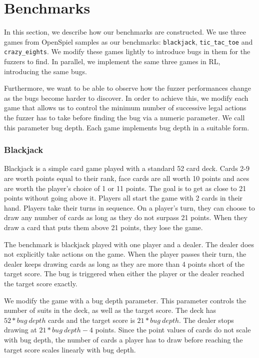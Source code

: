 \section{Benchmarks}
In this section, we describe how our benchmarks are constructed.
We use three games from OpenSpiel samples as our benchmarks: \texttt{blackjack}, \texttt{tic\_tac\_toe} and \texttt{crazy\_eights}.
We modify these games lightly to introduce bugs in them for the fuzzers to find.
In parallel, we implement the same three games in RL, introducing the same bugs.

Furthermore, we want to be able to observe how the fuzzer performances change as the bugs become harder to discover.
In order to achieve this, we modify each game that allows us to control the minimum number of successive legal actions the fuzzer has to take before finding the bug
via a numeric parameter.
We call this parameter bug depth. Each game implements bug depth in a suitable form.

\subsubsection{Blackjack}
Blackjack is a simple card game played with a standard 52 card deck.
Cards 2-9 are worth points equal to their rank, face cards are all worth 10 points and aces are worth the player's choice of 1 or 11 points.
The goal is to get as close to 21 points without going above it.
Players all start the game with 2 cards in their hand.
Players take their turns in sequence. On a player's turn, they can choose to draw any number of cards as long as they do not surpass 21 points.
When they draw a card that puts them above 21 points, they lose the game.

The benchmark is blackjack played with one player and a dealer. The dealer does not explicitly take actions on the game.
When the player passes their turn, the dealer keeps drawing cards as long as they are more than 4 points short of the target score.
The bug is triggered when either the player or the dealer reached the target score exactly.

We modify the game with a bug depth parameter. This parameter controls the number of suits in the deck, as well as the target score.
The deck has $52 * bug\ depth$ cards and the target score is $21 * bug\ depth$. The dealer stops drawing at $21 * bug\ depth - 4$ points.
Since the point values of cards do not scale with bug depth, the number of cards a player has to draw before reaching the target score scales linearly with bug depth. 

